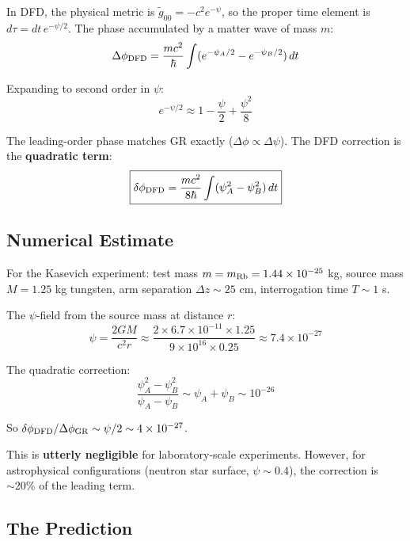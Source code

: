 \documentclass[11pt]{article}
\begin{document}
In DFD, the physical metric is $\tilde{g}_{00} = -c^2 e^{-\psi}$, so the proper time
element is $d\tau = dt\,e^{-\psi/2}$. The phase accumulated by a matter wave of mass $m$:
\begin{equation}
\Delta\phi_{\rm DFD} = \frac{mc^2}{\hbar}\int (e^{-\psi_A/2} - e^{-\psi_B/2})\,dt
\end{equation}

Expanding to second order in $\psi$:
\begin{equation}
e^{-\psi/2} \approx 1 - \frac{\psi}{2} + \frac{\psi^2}{8}
\end{equation}

The leading-order phase matches GR exactly ($\Delta\phi \propto \Delta\psi$). The DFD
correction is the \textbf{quadratic term}:
\begin{equation}
\boxed{\delta\phi_{\rm DFD} = \frac{mc^2}{8\hbar}\int (\psi_A^2 - \psi_B^2)\,dt}
\end{equation}

\subsection{Numerical Estimate}

For the Kasevich experiment: test mass $m = m_{\rm Rb} = 1.44 \times 10^{-25}$ kg,
source mass $M = 1.25$ kg tungsten, arm separation $\Delta z \sim 25$ cm, interrogation
time $T \sim 1$ s.

The $\psi$-field from the source mass at distance $r$:
\begin{equation}
\psi = \frac{2GM}{c^2 r} \approx \frac{2 \times 6.7 \times 10^{-11} \times 1.25}{9 \times 10^{16} \times 0.25}
\approx 7.4 \times 10^{-27}
\end{equation}

The quadratic correction:
\begin{equation}
\frac{\psi_A^2 - \psi_B^2}{\psi_A - \psi_B} \sim \psi_A + \psi_B \sim 10^{-26}
\end{equation}

So $\delta\phi_{\rm DFD}/\Delta\phi_{\rm GR} \sim \psi/2 \sim 4 \times 10^{-27}$.

This is \textbf{utterly negligible} for laboratory-scale experiments. However, for
astrophysical configurations (neutron star surface, $\psi \sim 0.4$), the correction
is $\sim 20\%$ of the leading term.

\subsection{The Prediction}
\end{document}
